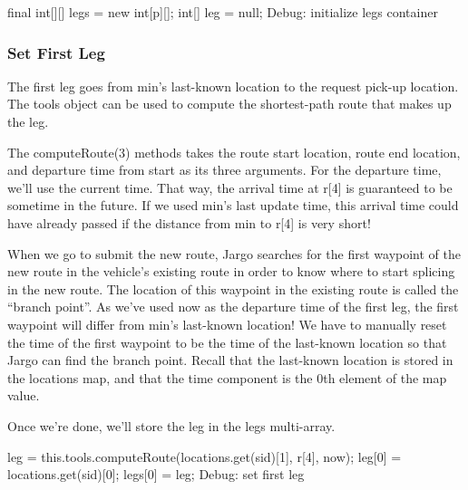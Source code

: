 \nwenddocs{}\endmoddef\nwstartdeflinemarkup{}\nwenddeflinemarkup
final int[][] legs = new int[p][];
int[] leg = null;
\LA{}Debug: initialize legs container~{\nwtagstyle{}}\RA{}
\nwendcode{}\nwdocspar

\subsubsection{Set First Leg}

The first leg goes from {\Tt{}min\nwendquote}'s last-known location to the request pick-up
location. The {\Tt{}tools\nwendquote} object can be used to compute the shortest-path route
that makes up the leg.

The {\Tt{}computeRoute\nwendquote}(3) methods takes the route start location, route end
location, and departure time from start as its three arguments. For the
departure time, we'll use the current time. That way, the arrival time at
{\Tt{}r[4]\nwendquote} is guaranteed to be sometime in the future.  If we used {\Tt{}min\nwendquote}'s last
update time, this arrival time could have already passed if the distance from
{\Tt{}min\nwendquote} to {\Tt{}r[4]\nwendquote} is very short!

When we go to submit the new route, Jargo searches for the first waypoint of
the new route in the vehicle's existing route in order to know where to start
splicing in the new route. The location of this waypoint in the existing route
is called the ``branch point''. As we've used {\Tt{}now\nwendquote} as the departure time of
the first leg, the first waypoint will differ from {\Tt{}min\nwendquote}'s last-known
location! We have to manually reset the time of the first waypoint to be the
time of the last-known location so that Jargo can find the branch point. Recall
that the last-known location is stored in the {\Tt{}locations\nwendquote} map, and that the
time component is the 0th element of the map value.

Once we're done, we'll store the leg in the {\Tt{}legs\nwendquote} multi-array.

\nwenddocs{}\endmoddef\nwstartdeflinemarkup{}\nwenddeflinemarkup
leg = this.tools.computeRoute(locations.get(sid)[1], r[4], now);
leg[0] = locations.get(sid)[0];
legs[0] = leg;
\LA{}Debug: set first leg~{\nwtagstyle{}}\RA{}
\nwendcode{}\nwdocspar

